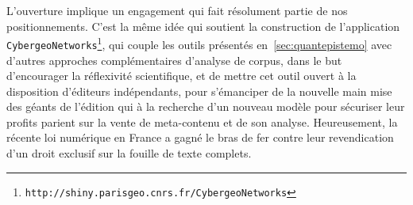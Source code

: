 L'ouverture implique un engagement qui fait résolument partie de nos positionnements. C'est la même idée qui soutient la construction de l'application \texttt{CybergeoNetworks}\footnote{\texttt{http://shiny.parisgeo.cnrs.fr/CybergeoNetworks}}, qui couple les outils présentés en~\ref{sec:quantepistemo} avec d'autres approches complémentaires d'analyse de corpus, dans le but d'encourager la réflexivité scientifique, et de mettre cet outil ouvert à la disposition d'éditeurs indépendants, pour s'émanciper de la nouvelle main mise des géants de l'édition qui à la recherche d'un nouveau modèle pour sécuriser leur profits parient sur la vente de meta-contenu et de son analyse. Heureusement, la récente loi numérique en France a gagné le bras de fer contre leur revendication d'un droit exclusif sur la fouille de texte complets.






\stars








